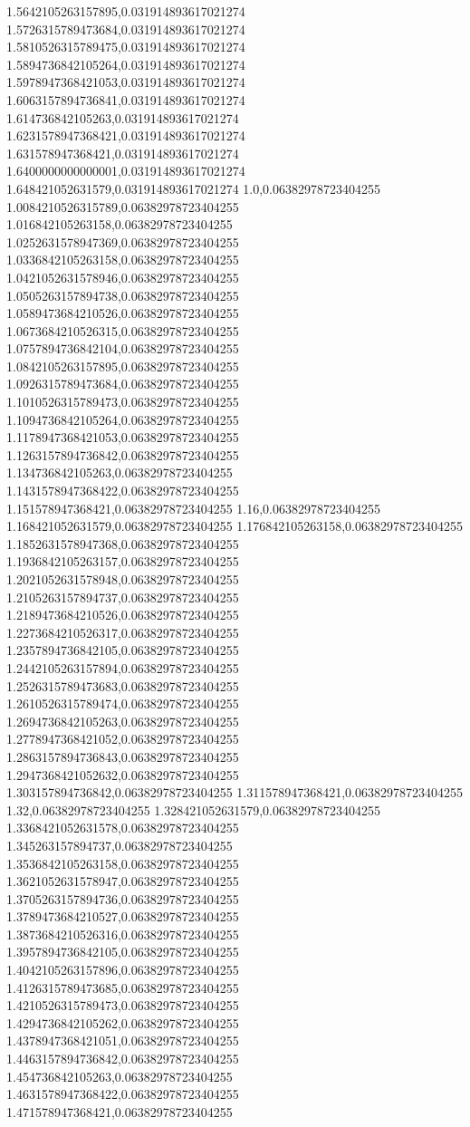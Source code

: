 1.5642105263157895,0.031914893617021274
1.5726315789473684,0.031914893617021274
1.5810526315789475,0.031914893617021274
1.5894736842105264,0.031914893617021274
1.5978947368421053,0.031914893617021274
1.6063157894736841,0.031914893617021274
1.614736842105263,0.031914893617021274
1.6231578947368421,0.031914893617021274
1.631578947368421,0.031914893617021274
1.6400000000000001,0.031914893617021274
1.648421052631579,0.031914893617021274
1.0,0.06382978723404255
1.0084210526315789,0.06382978723404255
1.016842105263158,0.06382978723404255
1.0252631578947369,0.06382978723404255
1.0336842105263158,0.06382978723404255
1.0421052631578946,0.06382978723404255
1.0505263157894738,0.06382978723404255
1.0589473684210526,0.06382978723404255
1.0673684210526315,0.06382978723404255
1.0757894736842104,0.06382978723404255
1.0842105263157895,0.06382978723404255
1.0926315789473684,0.06382978723404255
1.1010526315789473,0.06382978723404255
1.1094736842105264,0.06382978723404255
1.1178947368421053,0.06382978723404255
1.1263157894736842,0.06382978723404255
1.134736842105263,0.06382978723404255
1.1431578947368422,0.06382978723404255
1.151578947368421,0.06382978723404255
1.16,0.06382978723404255
1.168421052631579,0.06382978723404255
1.176842105263158,0.06382978723404255
1.1852631578947368,0.06382978723404255
1.1936842105263157,0.06382978723404255
1.2021052631578948,0.06382978723404255
1.2105263157894737,0.06382978723404255
1.2189473684210526,0.06382978723404255
1.2273684210526317,0.06382978723404255
1.2357894736842105,0.06382978723404255
1.2442105263157894,0.06382978723404255
1.2526315789473683,0.06382978723404255
1.2610526315789474,0.06382978723404255
1.2694736842105263,0.06382978723404255
1.2778947368421052,0.06382978723404255
1.2863157894736843,0.06382978723404255
1.2947368421052632,0.06382978723404255
1.303157894736842,0.06382978723404255
1.311578947368421,0.06382978723404255
1.32,0.06382978723404255
1.328421052631579,0.06382978723404255
1.3368421052631578,0.06382978723404255
1.345263157894737,0.06382978723404255
1.3536842105263158,0.06382978723404255
1.3621052631578947,0.06382978723404255
1.3705263157894736,0.06382978723404255
1.3789473684210527,0.06382978723404255
1.3873684210526316,0.06382978723404255
1.3957894736842105,0.06382978723404255
1.4042105263157896,0.06382978723404255
1.4126315789473685,0.06382978723404255
1.4210526315789473,0.06382978723404255
1.4294736842105262,0.06382978723404255
1.4378947368421051,0.06382978723404255
1.4463157894736842,0.06382978723404255
1.454736842105263,0.06382978723404255
1.4631578947368422,0.06382978723404255
1.471578947368421,0.06382978723404255
